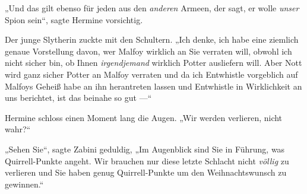 „Und das gilt ebenso für jeden aus den \emph{anderen} Armeen, der sagt, er wolle \emph{unser} Spion sein“, sagte Hermine vorsichtig.

Der junge Slytherin zuckte mit den Schultern.
„Ich denke, ich habe eine ziemlich genaue Vorstellung davon, wer Malfoy wirklich an Sie verraten will, obwohl ich nicht sicher bin, ob Ihnen \emph{irgendjemand} wirklich Potter ausliefern will. Aber Nott wird ganz sicher Potter an Malfoy verraten und da ich Entwhistle vorgeblich auf Malfoys Geheiß habe an ihn herantreten lassen und Entwhistle in Wirklichkeit an uns berichtet, ist das beinahe so gut —“

Hermine schloss einen Moment lang die Augen.
„Wir werden verlieren, nicht wahr?“

„Sehen Sie“, sagte Zabini geduldig,
„Im Augenblick sind Sie in Führung, was Quirrell-Punkte angeht. Wir brauchen nur diese letzte Schlacht nicht \emph{völlig} zu verlieren und Sie haben genug Quirrell-Punkte um den Weihnachtswunsch zu gewinnen.“

